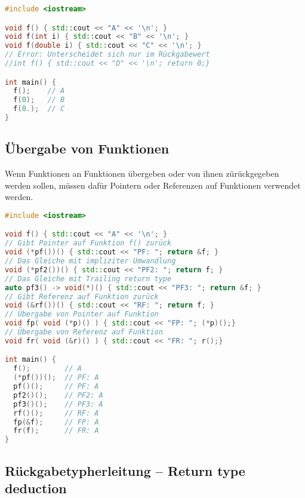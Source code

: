 \begin{lstlisting}[language=C++]
#include <iostream>

void f() { std::cout << "A" << '\n'; }
void f(int i) { std::cout << "B" << '\n'; }
void f(double i) { std::cout << "C" << '\n'; }
// Error: Unterscheidet sich nur im Rückgabewert
//int f() { std::cout << "D" << '\n'; return 0;}

int main() {
  f();    // A
  f(0);   // B
  f(0.);  // C
}
\end{lstlisting}

\subsection{Übergabe von Funktionen}

Wenn Funktionen an Funktionen übergeben oder von ihnen zürückgegeben werden
sollen, müssen dafür Pointern oder Referenzen auf Funktionen verwendet werden.

\begin{lstlisting}[language=C++]
#include <iostream>

void f() { std::cout << "A" << '\n'; }
// Gibt Pointer auf Funktion f() zurück
void (*pf())() { std::cout << "PF: "; return &f; }
// Das Gleiche mit impliziter Umwandlung
void (*pf2())() { std::cout << "PF2: "; return f; }
// Das Gleiche mit Trailing return type
auto pf3() -> void(*)() { std::cout << "PF3: "; return &f; }
// Gibt Referenz auf Funktion zurück
void (&rf())() { std::cout << "RF: "; return f; }
// Übergabe von Pointer auf Funktion
void fp( void (*p)() ) { std::cout << "FP: "; (*p)();}
// Übergabe von Referenz auf Funktion
void fr( void (&r)() ) { std::cout << "FR: "; r();}

int main() {
  f();        // A
  (*pf())();  // PF: A
  pf()();     // PF: A
  pf2()();    // PF2: A
  pf3()();    // PF3: A
  rf()();     // RF: A
  fp(&f);     // FP: A
  fr(f);      // FR: A
}
\end{lstlisting}

\subsection{Rückgabetypherleitung --  Return type deduction}

